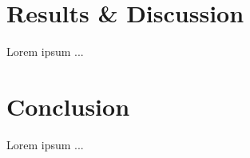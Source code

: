 \documentclass[shortpaper]{revdetua}
\begin{document}

\section{Results \& Discussion}

Lorem ipsum ...




\section{Conclusion}

Lorem ipsum ...


 

\end{document}

